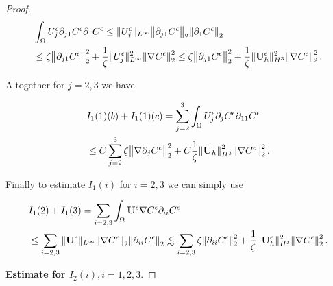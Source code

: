 \documentclass[11pt]{article}
\begin{document}
\begin{proof}
\begin{equation} \nonumber
\begin{split}
& \int_\Omega U_j^\epsilon \partial_{j1} C^\epsilon \partial_1 C^\epsilon \leq \| U_j^\epsilon \| _{L^\infty} \norm{\partial_{j1} C^\epsilon}_2 \norm{\partial_1 C^\epsilon}_2 \\
& \leq \zeta \norm{\partial_{j1} C^\epsilon}_2^2 + \frac{1}{\zeta} \| U_j^\epsilon \| _{L^\infty}^2 \norm{\nabla C^\epsilon}_2^2 \leq \zeta \norm{\partial_{j1} C^\epsilon}_2^2 + \frac{1}{\zeta} \| \mathbf{U}_h^\epsilon \| _{H^3}^2 \norm{\nabla C^\epsilon}_2^2. 
\end{split}
\end{equation}

Altogether for $j = 2,3$ we have

\begin{equation}
\begin{split}
& I_1(1)(b) + I_1(1)(c) = \sum_{j=2}^3 \int_\Omega U_j^\epsilon \partial_j C^\epsilon \partial_{11} C^\epsilon \\
& \leq C \sum_{j=2}^3 \zeta \norm{\nabla \partial_j C^\epsilon}_2^2 + C \frac{1}{\zeta} \norm{\mathbf{U}_h}_{H^3}^2 \norm{\nabla C^\epsilon}_2^2.
\end{split}
\end{equation}

Finally to estimate $I_1(i)$ for $i = 2,3$ we can simply use

\begin{equation}
\begin{split}
& I_1(2) + I_1(3) = \sum_{i = 2,3} \int_\Omega \mathbf{U}^\epsilon \nabla C^\epsilon \partial_{ii} C^\epsilon \\
& \leq \sum_{i = 2,3} \| \mathbf{U}^\epsilon \| _{L^\infty} \norm{\nabla C^\epsilon}_2 \norm{\partial_{ii}C^\epsilon}_2 \lesssim \sum_{i = 2,3} \zeta \norm{\partial_{ii} C^\epsilon}_2^2 + \frac{1}{\zeta} \| \mathbf{U}_h^\epsilon \| _ {H^3} ^ 2 \norm{\nabla C^\epsilon}_2^2. \raisetag{50pt}
\end{split}
\end{equation}

\bigskip

\textbf{Estimate for $I_2(i), i=1,2,3.$}


\end{proof}
\end{document}
